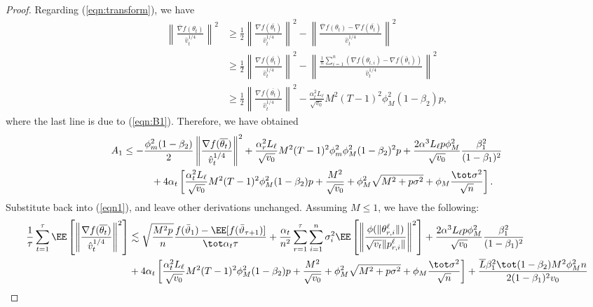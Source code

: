 \documentclass{article}
\begin{document}
\begin{proof}
Regarding (\ref{eqn:transform}), we have
\begin{align*}
\left\| \frac{\overline{\nabla}f(\theta_t)}{\hat v_t^{1/4}} \right\|^2 & \geq \frac{1}{2} \left\| \frac{\nabla f(\overline{\theta_t})}{\hat v_t^{1/4}} \right\|^2 - \left\| \frac{\overline{\nabla}f(\theta_t)- \nabla f(\overline{\theta_t})}{\hat v_t^{1/4}} \right\|^2\\
& \geq \frac{1}{2} \left\| \frac{\nabla f(\overline{\theta_t})}{\hat v_t^{1/4}} \right\|^2 - \left\| \frac{\frac{1}{n}\sum_{i=1}^n (\nabla f(\theta_{t,i})-\nabla f(\bar\theta_i))}{\hat v_t^{1/4}} \right\|^2 \\
&\geq \frac{1}{2} \left\| \frac{\nabla f(\overline{\theta_t})}{\hat v_t^{1/4}} \right\|^2 - \frac{\alpha_t^2 L_\ell}{\sqrt{v_0}} M^2 (T-1)^2 \phi_M^2 (1-\beta_2)p,
\end{align*}
where the last line is due to (\ref{eqn:B1}). Therefore, we have obtained
\begin{align*}
    A_1&\leq -\frac{\phi_m^2(1-\beta_2)}{2}\left\| \frac{\nabla f(\overline{\theta_t})}{\hat v_t^{1/4}} \right\|^2+\frac{\alpha_r^2 L_\ell}{\sqrt{v_0}} M^2 (T-1)^2 \phi_m^2\phi_M^2 (1-\beta_2)^2p+\frac{2\alpha^3 L_\ell p\phi_M^2}{ \sqrt{v_0}}\frac{\beta_1^2}{(1-\beta_1)^2} \\
    &\hspace{0.4in}  + 4\alpha_t \left[ \frac{\alpha_t^2 L_\ell}{\sqrt{v_0}}  M^2 (T-1)^2 \phi_M^2 (1-\beta_2)p + \frac{M^2}{\sqrt{v_0}}+\phi_M^2\sqrt{M^2+p\sigma^2} + \phi_M \frac{\tot \sigma^2}{\sqrt{n}}\right].
\end{align*}
Substitute back into (\ref{eqn1}), and leave other derivations unchanged. Assuming $M\leq 1$, we have the following:
\begin{align*}
    \frac{1}{\tau}\sum_{t=1}^\tau  \EE\left[ \left\| \frac{\nabla f(\overline{\theta_t})}{\hat v_t^{1/4}}   \right \|^2 \right] & \lesssim  \sqrt{\frac{M^2 p}{n}} \frac{ f(\bar{\vartheta}_1)  - \EE[ f(\bar{\vartheta}_{\tau+1})]}{\tot \alpha_t \tau}+   \frac{\alpha_t}{n^2}  \sum_{r=1}^\tau  \sum_{i = 1}^n  \sigma_i^2 \EE\left[ \left\|\frac{\phi(\|\theta_{r,i}^{\ell}\|)}{\sqrt{v_t} \|p_{r,i}^{\ell}\|} \right\|^2 \right] +\frac{2\alpha^3 L_\ell p\phi_M^2}{ \sqrt{v_0}}\frac{\beta_1^2}{(1-\beta_1)^2} \nonumber\\
   &   +4\alpha_t \left[ \frac{\alpha_t^2 L_\ell}{\sqrt{v_0}}  M^2 (T-1)^2 \phi_M^2 (1-\beta_2)p + \frac{M^2}{\sqrt{v_0}}+\phi_M^2\sqrt{M^2+p\sigma^2} + \phi_M \frac{\tot \sigma^2}{\sqrt{n}}\right] + \frac{ \overline{L}\beta_1^2\tot(1-\beta_2)M^2 \phi^2_M n}{2(1-\beta_1)^2 v_0}   \nonumber \\

\end{align*}
\end{proof}
\end{document}

